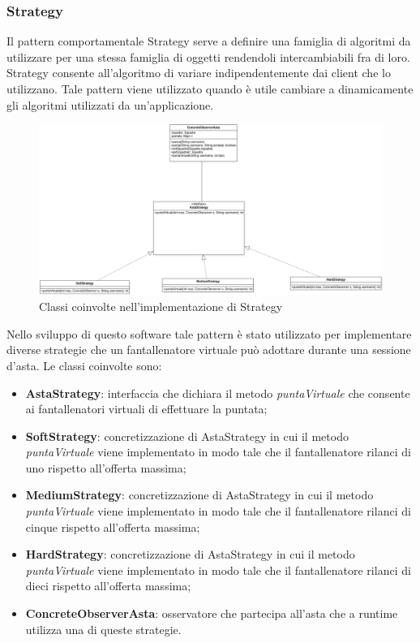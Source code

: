\documentclass[12pt,a4paper]{article}
\begin{document}
\subsubsection{Strategy}
Il pattern comportamentale Strategy serve a definire una famiglia di algoritmi da utilizzare per una stessa famiglia di oggetti rendendoli intercambiabili fra di loro. Strategy consente all'algoritmo di variare indipendentemente dai client che lo utilizzano. Tale pattern viene utilizzato quando è utile cambiare a dinamicamente  gli algoritmi utilizzati da un'applicazione. 
\begin{figure}[h]
\centering
\includegraphics[width=18 cm ,keepaspectratio]{Strategy}
\caption{Classi coinvolte nell'implementazione di Strategy}
\end{figure}
\newline
Nello sviluppo di questo software tale pattern è stato utilizzato per implementare diverse strategie che un fantallenatore virtuale può adottare durante una sessione d'asta. Le classi coinvolte sono:
\begin{itemize}
\item \textbf{AstaStrategy}: interfaccia che dichiara il metodo \textit{puntaVirtuale} che consente ai fantallenatori virtuali di effettuare la puntata;
\item \textbf{SoftStrategy}: concretizzazione di AstaStrategy in cui il metodo \textit{puntaVirtuale} viene implementato in modo tale che il fantallenatore rilanci di uno rispetto all'offerta massima;
\item \textbf{MediumStrategy}: concretizzazione di AstaStrategy in cui il metodo \textit{puntaVirtuale} viene implementato in modo tale che il fantallenatore rilanci di cinque rispetto all'offerta massima;
\item \textbf{HardStrategy}: concretizzazione di AstaStrategy in cui il metodo \textit{puntaVirtuale} viene implementato in modo tale che il fantallenatore rilanci di dieci rispetto all'offerta massima;
\item \textbf{ConcreteObserverAsta}: osservatore che partecipa all'asta che a runtime utilizza una di queste strategie.

\end{itemize}
\end{document}
